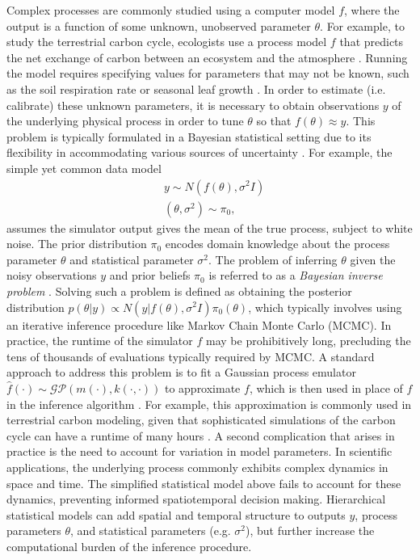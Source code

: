 \documentclass[12pt]{article}
\begin{document}
Complex processes are commonly studied using a computer model $f$, where the output is a function of some unknown, unobserved parameter $\theta$.
For example, to study the terrestrial carbon cycle, ecologists use a process model $f$ 
that predicts the net exchange of carbon between an ecosystem and the atmosphere \cite{Friedlingstein, Waring}. Running the model requires specifying values for parameters that 
may not be known, such as the soil respiration rate or seasonal leaf growth \cite{Fer}. In order to estimate (i.e. calibrate) these unknown parameters, it is necessary to obtain observations $y$ 
of the underlying physical process in order to tune $\theta$ so that $f(\theta) \approx y$. This problem is typically formulated in a Bayesian statistical setting due to its flexibility in accommodating
various sources of uncertainty \cite{Kennedy, Clark}. For example, the simple yet common data model\begin{align*}
&y \sim N(f(\theta), \sigma^2 I) \\
&(\theta, \sigma^2) \sim \pi_0,
\end{align*}
assumes the simulator output gives the mean of the true process, subject to white noise. The prior distribution $\pi_0$ encodes domain knowledge about the 
process parameter $\theta$ and statistical parameter $\sigma^2$. The problem of inferring $\theta$ given the noisy observations $y$ and prior beliefs $\pi_0$ is referred to as a \textit{Bayesian inverse problem} \cite{Stuart}. Solving such a problem is defined 
 as obtaining the posterior distribution $p(\theta|y) \propto N(y|f(\theta), \sigma^2 I)\pi_0(\theta)$, which typically involves using an iterative inference procedure like Markov Chain Monte Carlo (MCMC). In practice, the runtime of the simulator $f$ may be prohibitively long, precluding the tens of thousands of evaluations typically required by MCMC. A standard approach to address this problem is to fit a Gaussian process 
emulator $\hat{f}(\cdot) \sim \mathcal{GP}(m(\cdot), k(\cdot, \cdot))$ to approximate $f$, which is then used in place of $f$ in the inference algorithm \cite{Kennedy, Fer, Cleary}. For example, this approximation is commonly used in terrestrial carbon modeling, given that sophisticated simulations of the carbon cycle can have a runtime of many hours \cite{Fer}. A second complication that arises in practice is the need to account for variation in model
parameters. In scientific applications, the underlying process commonly exhibits complex dynamics in space and time. The simplified statistical model above fails to account for these dynamics, preventing informed spatiotemporal decision making. Hierarchical statistical models can add spatial and temporal structure
to outputs $y$, process parameters $\theta$, and statistical parameters (e.g. $\sigma^2$), but further increase the computational burden of the inference procedure. 
 
\end{document}
